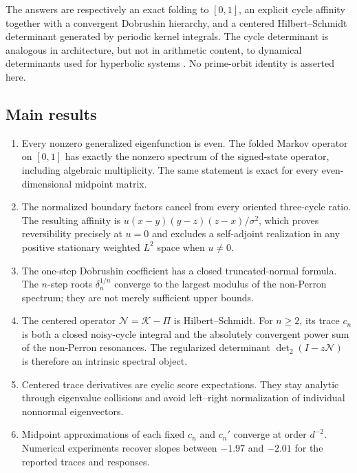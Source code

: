 \documentclass[11pt]{article}
\theoremstyle{definition}
\theoremstyle{remark}
\newcommand{\cK}{\mathcal K}
\newcommand{\cN}{\mathcal N}
\begin{document}
The answers are respectively an exact folding to $[0,1]$, an explicit cycle
affinity together with a convergent Dobrushin hierarchy, and a centered
Hilbert--Schmidt determinant generated by periodic kernel integrals.  The
cycle determinant is analogous in architecture, but not in arithmetic
content, to dynamical determinants used for hyperbolic systems
\citep{Ruelle1976,Baladi2018}.  No prime-orbit identity is asserted here.

\subsection*{Main results}

\begin{enumerate}[label=\textbf{R\arabic*.},leftmargin=3.2em]
 \item Every nonzero generalized eigenfunction is even.  The folded Markov
 operator on $[0,1]$ has exactly the nonzero spectrum of the signed-state
 operator, including algebraic multiplicity.  The same statement is exact
 for every even-dimensional midpoint matrix.

 \item The normalized boundary factors cancel from every oriented three-cycle
 ratio.  The resulting affinity is
 $u(x-y)(y-z)(z-x)/\sigma^2$, which proves reversibility precisely at $u=0$
 and excludes a self-adjoint realization in any positive stationary
 weighted $L^2$ space when $u\ne0$.

 \item The one-step Dobrushin coefficient has a closed truncated-normal
 formula.  The $n$-step roots $\delta_n^{1/n}$ converge to the largest modulus
 of the non-Perron spectrum; they are not merely sufficient upper bounds.

 \item The centered operator $\cN=\cK-\Pi$ is Hilbert--Schmidt.  For $n\ge2$,
 its trace $c_n$ is both a closed noisy-cycle integral and the absolutely
 convergent power sum of the non-Perron resonances.  The regularized
 determinant $\det_2(I-z\cN)$ is therefore an intrinsic spectral object.

 \item Centered trace derivatives are cyclic score expectations.  They stay
 analytic through eigenvalue collisions and avoid left--right normalization
 of individual nonnormal eigenvectors.

 \item Midpoint approximations of each fixed $c_n$ and $c_n'$ converge at
 order $d^{-2}$.  Numerical experiments recover slopes between $-1.97$ and
 $-2.01$ for the reported traces and responses.
\end{enumerate}
\end{document}
